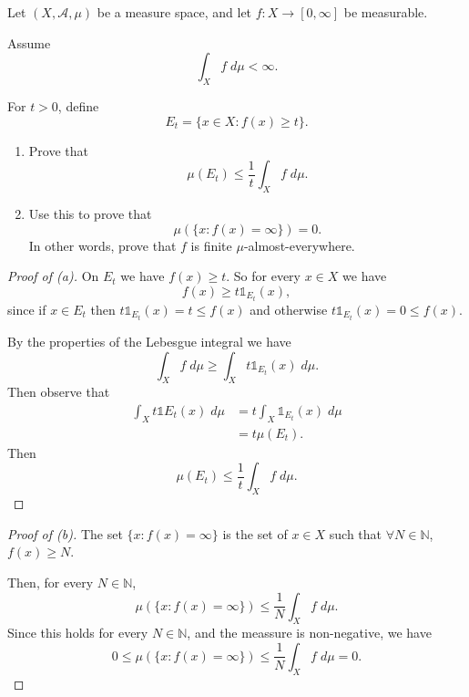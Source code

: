 \begin{prob}
    Let $(X, \mathcal A, \mu)$ be a measure space, and 
    let $f : X \to [0,\infty]$ be measurable.

    Assume 
    \[
        \int_X f \; d\mu < \infty.
    \]
    
    For $t > 0$, define 
    \[
        E_t = \{x \in X : f(x) \geq t\}.
    \]

    \begin{enumerate}[label=\alph*)]
        \item Prove that 
            \[
                \mu(E_t) \leq \frac{1}{t} \int_X f \; d\mu.
            \]
        \item Use this to prove that 
            \[
                \mu(\{x : f(x) = \infty\}) = 0.
            \]
            In other words, prove that $f$ is finite 
            $\mu$-almost-everywhere.
    \end{enumerate}
\end{prob}

\begin{proof}[Proof of (a)]
    On $E_t$ we have $f(x) \geq t$. So for every 
    $x \in X$ we have 
    \[
        f(x) \geq t \mathbb 1_{E_t}(x),
    \]
    since if $x \in E_t$ then $t\mathbb 1_{E_t}(x) = t \leq f(x)$ and 
    otherwise $t \mathbb 1_{E_t}(x) = 0 \leq f(x)$.

    By the properties of the Lebesgue integral we have 
    \[
        \int_X f \; d\mu \geq \int_X t \mathbb 1_{E_t}(x) \; d\mu.
    \]
    Then observe that 
    \begin{align*}
        \int_X t\mathbb 1 E_t(x) \; d\mu 
        &= t \int_X \mathbb 1_{E_t}(x) \; d\mu
        \\ 
        &= 
        t\mu(E_t).
    \end{align*}
    Then 
    \[
        \mu(E_t) \leq \frac{1}{t} \int_X f \; d\mu. 
    \]
\end{proof}
\begin{proof}[Proof of (b)]
    The set $\{x : f(x) = \infty\}$ is the set of 
    $x \in X$ such that $\forall N \in \mathbb N$, 
    $f(x) \geq N$.

    Then, for every $N \in \mathbb N$, 
    \[
        \mu(\{x : f(x) = \infty\}) 
        \leq \frac{1}{N} \int_X f \; d\mu. 
    \]
    Since this holds for every $N \in \mathbb N$, and 
    the meassure is non-negative, we have 
    \[
        0 \leq \mu(\{x : f(x) = \infty\}) 
        \leq \frac{1}{N} \int_X f \; d\mu = 0.
    \]
\end{proof}

